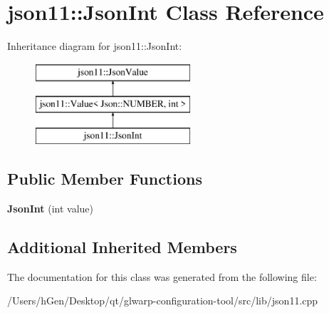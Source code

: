 \hypertarget{classjson11_1_1_json_int}{}\section{json11\+:\+:Json\+Int Class Reference}
\label{classjson11_1_1_json_int}
Inheritance diagram for json11\+:\+:Json\+Int\+:\begin{figure}[H]
\begin{center}
\leavevmode
\includegraphics[height=3.000000cm]{classjson11_1_1_json_int}
\end{center}
\end{figure}
\subsection*{Public Member Functions}
\begin{DoxyCompactItemize}
\item 
\mbox{\label{classjson11_1_1_json_int_a8e1607a772d00863178dfd3b7d4e9e6e}} 
{\bfseries Json\+Int} (int value)
\end{DoxyCompactItemize}
\subsection*{Additional Inherited Members}


The documentation for this class was generated from the following file\+:\begin{DoxyCompactItemize}
\item 
/\+Users/h\+Gen/\+Desktop/qt/glwarp-\/configuration-\/tool/src/lib/json11.\+cpp\end{DoxyCompactItemize}
